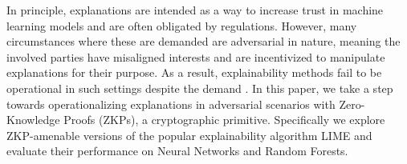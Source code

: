 
In principle, explanations are intended as a way to increase trust in machine learning models and are often obligated by regulations. However, many circumstances where these are demanded are adversarial in nature, meaning the involved parties have misaligned interests and are incentivized to manipulate explanations for their purpose. As a result, explainability methods fail to be operational in such settings despite the demand \cite{bordt2022post}. In this paper, we take a step towards operationalizing explanations in adversarial scenarios with Zero-Knowledge Proofs (ZKPs), a cryptographic primitive. Specifically we explore ZKP-amenable versions of the popular explainability algorithm LIME and evaluate their performance on Neural Networks and Random Forests.%